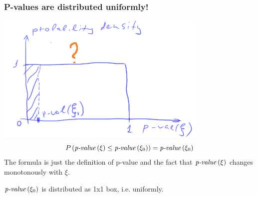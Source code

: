 \documentclass{beamer}
\newcommand{\pval}{\text{\textit{p-value}}}
\begin{document}
	\begin{frame}
		\frametitle{P-values are distributed uniformly!}
		\begin{center}
			\includegraphics[scale=0.6]{p_val_is_flat_by_def_picture}
		\textcolor{violet}{$$ P\left(\pval\left(\xi\right) \leq \pval\left(\xi_0\right)\right)=\pval\left(\xi_0\right)$$}
		The formula is just the definition of p-value and the fact that $\pval\left(\xi\right)$ changes monotonously with $\xi$.

		$\pval\left(\xi_0\right)$ is distributed as 1x1 box, i.e. uniformly.
		\end{center}
	\end{frame}
\end{document}
